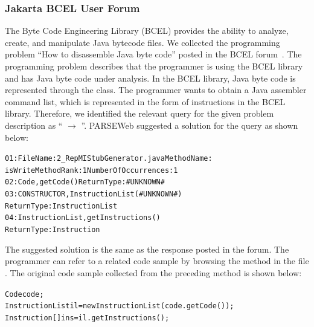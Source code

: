 \documentclass{fp035-thummalapenta}
\begin{document}
\subsubsection{Jakarta BCEL User Forum}

The Byte Code Engineering Library (BCEL) provides the ability to
analyze, create, and manipulate Java bytecode files. We collected the
programming problem ``How to disassemble Java byte code'' posted in
the BCEL forum~\cite{BCELForum}. The programming problem describes
that the programmer is using the BCEL library and has Java byte code
under analysis. In the BCEL library, Java byte code is represented
through the  class. The programmer wants to obtain a
Java assembler command list, which is represented in the form of
instructions in the BCEL library. Therefore, we identified the
relevant query for the given problem description as ``
$\rightarrow$ ''. PARSEWeb suggested a solution
for the query as shown below:

\begin{CodeOut}
\begin{alltt}
01:FileName:2\_RepMIStubGenerator.java MethodName:
\hspace*{0.2in}isWriteMethod Rank:1 NumberOfOccurrences:1
02:Code,getCode() ReturnType:\#UNKNOWN\#
03:CONSTRUCTOR,InstructionList(\#UNKNOWN\#)
\hspace*{0.2in}ReturnType:InstructionList
04:InstructionList,getInstructions() 
\hspace*{0.2in}ReturnType:Instruction
\end{alltt}
\end{CodeOut}

The suggested solution is the same as the response posted in the forum. The programmer
can refer to a related code sample by browsing the  method
in the file . 
The original code sample collected from the
preceding method is shown below:

\begin{CodeOut}
\begin{alltt}
Code code;
InstructionList il = new InstructionList(code.getCode());
Instruction[] ins = il.getInstructions();
\end{alltt}
\end{CodeOut}
\end{document}
